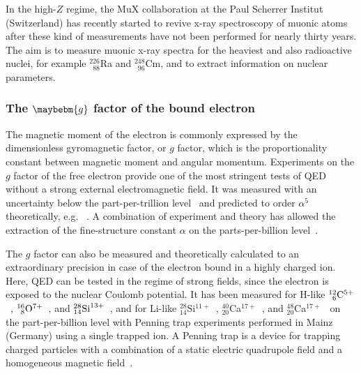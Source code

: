 In the high-$Z$ regime, the MuX collaboration at the Paul Scherrer Institut (Switzerland) has recently started to revive x-ray spectroscopy of muonic atoms after these kind of measurements have not been performed for nearly thirty years.
The aim is to measure muonic x-ray spectra for the heaviest and also radioactive nuclei, for example $^{226}_{\phantom{1}88}$Ra and $^{248}_{\phantom{1}96}$Cm, and to extract information on nuclear parameters. 

\subsubsection*{The $\maybebm{g}$ factor of the bound electron}
The magnetic moment of the electron is commonly expressed by the dimensionless gyromagnetic factor, or $g$ factor, which is the proportionality constant between magnetic moment and angular momentum. Experiments on the $g$ factor of the free electron provide one of the most stringent tests of QED without a strong external electromagnetic field. It was measured with an uncertainty below the part-per-trillion level~\cite{odom2006,hanneke2008} and predicted to order $\alpha^5$ theoretically, e.g.~  \cite{schwinger1948,Peterman57,Sommerfield1957,Sommerfield58,Laporta96,kinoshita2006,aoyama2007,aoyama2015,aoyama2017}. A combination of experiment and theory has allowed the extraction of the fine-structure constant $\alpha$ on the parts-per-billion level~\cite{gabrielse2006,gabrielse2007}.

The $g$ factor can also be measured and theoretically calculated to an extraordinary precision in case of the electron bound in a highly charged ion. Here, QED can be tested in the regime of strong fields, since the electron is exposed to the nuclear Coulomb potential. It has been measured for H-like $^{12}_{\phantom{0}6}\rm{C}^{5+}$~\cite{Haffner2000,Sturm2014}, $^{16}_{\phantom{0}8}\rm{O}^{7+}$~\cite{Verdu2004}, and $^{28}_{14}\rm{Si}^{13+}$~\cite{Sturm2011}, and for Li-like $^{28}_{14}$Si$^{11+}$~\cite{sturm2013}, $^{40}_{20}$Ca$^{17+}$~\cite{Kohler2016}, and $^{48}_{20}$Ca$^{17+}$~\cite{Kohler2016} on the part-per-billion level with Penning trap experiments performed in Mainz (Germany) using a single trapped ion. A Penning trap is a device for trapping charged particles with a combination of a static electric quadrupole field and a homogeneous magnetic field~\cite{annphysgfactor,geoniumtheory}. 

